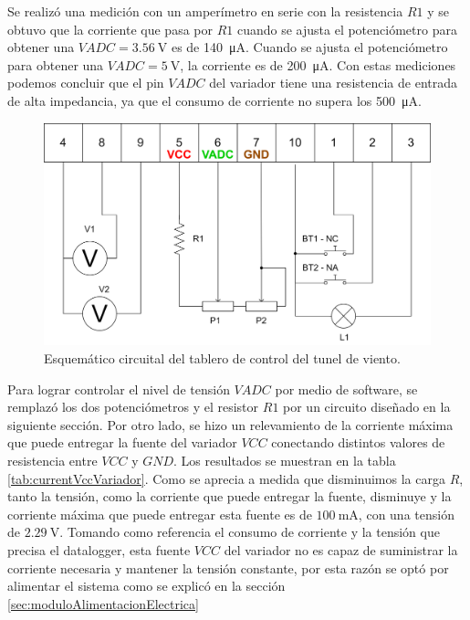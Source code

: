 Se realizó una medición con un amperímetro en serie con la resistencia $R1$ y se obtuvo que la corriente que pasa por $R1$ cuando se ajusta el potenciómetro para obtener una $VADC = \SI{3.56}{\volt}$ es de \SI{140}{\micro\ampere}. Cuando se ajusta el potenciómetro para obtener una $VADC = \SI{5}{\volt}$, la corriente es de \SI{200}{\micro\ampere}. Con estas mediciones podemos concluir que el pin $VADC$ del variador tiene una resistencia de entrada de alta impedancia, ya que el consumo de corriente no supera los \SI{500}{\micro\ampere}.







\begin{figure}[H]
    \centering
    \includegraphics[width=0.9\linewidth]{Figuras/datalogger/Hardware/esquemCircuitoControlTunel.png}
    \caption{Esquemático circuital del tablero de control del tunel de viento.}
    \label{fig:esquemCircuitoControlTunel}
\end{figure}

Para lograr controlar el nivel de tensión $VADC$ por medio de software, se remplazó los dos potenciómetros y el resistor $R1$ por un circuito diseñado en la siguiente sección. Por otro lado, se hizo un relevamiento de la corriente máxima que puede entregar la fuente del variador $VCC$ conectando distintos valores de resistencia entre $VCC$ y $GND$. Los resultados se muestran en la tabla \ref{tab:currentVccVariador}. Como se aprecia a medida que disminuimos la carga $R$, tanto la tensión, como la corriente que puede entregar la fuente, disminuye y la corriente máxima que puede entregar esta fuente es de $\SI{100}{\milli\ampere}$, con una tensión de $\SI{2.29}{\volt}$. Tomando como referencia el consumo de corriente y la tensión que precisa el datalogger, esta fuente $VCC$ del variador no es capaz de suministrar la corriente necesaria y mantener la tensión constante, por esta razón se optó por alimentar el sistema como se explicó en la sección \ref{sec:moduloAlimentacionElectrica}



